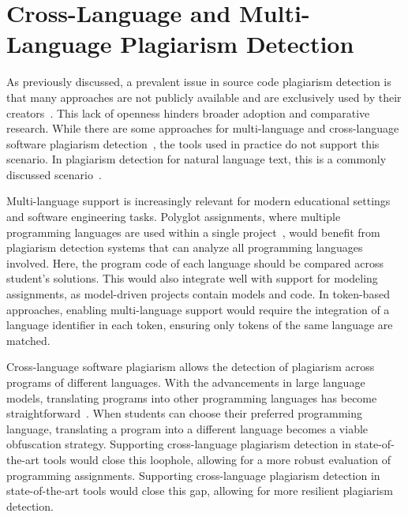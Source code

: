 \section{Cross-Language and Multi-Language Plagiarism Detection}
As previously discussed, a prevalent issue in source code plagiarism detection is that many approaches are not publicly available and are exclusively used by their creators~\cite{Novak2019}.
This lack of openness hinders broader adoption and comparative research.
While there are some approaches for multi-language and cross-language software plagiarism detection~\cite{Arwin2006}, the tools used in practice do not support this scenario. In plagiarism detection for natural language text, this is a commonly discussed scenario~\cite{BottoTobar2022}.

Multi-language support is increasingly relevant for modern educational settings and software engineering tasks. Polyglot assignments, where multiple programming languages are used within a single project~\cite{Mussbacher2024}, would benefit from plagiarism detection systems that can analyze all programming languages involved. Here, the program code of each language should be compared across student's solutions.
This would also integrate well with support for modeling assignments, as model-driven projects contain models and code. In token-based approaches, enabling multi-language support would require the integration of a language identifier in each token, ensuring only tokens of the same language are matched.

Cross-language software plagiarism allows the detection of plagiarism across programs of different languages. With the advancements in large language models, translating programs into other programming languages has become straightforward~\cite{Pan2024b}. 
When students can choose their preferred programming language, translating a program into a different language becomes a viable obfuscation strategy.
Supporting cross-language plagiarism detection in state-of-the-art tools would close this loophole, allowing for a more robust evaluation of programming assignments.
Supporting cross-language plagiarism detection in state-of-the-art tools would close this gap, allowing for more resilient plagiarism detection.


